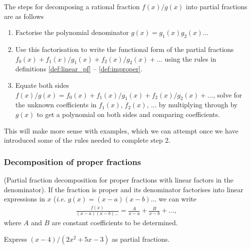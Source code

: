 The steps for decomposing a rational fraction $f(x)/g(x)$ into partial fractions are as follows
\begin{enumerate}
    \item Factorise the polynomial denominator $g(x) = g_1(x)g_2(x)\ldots$
    \item Use this factorisation to write the functional form of the partial fractions $f_0(x) + f_1(x)/g_1(x) + f_2(x)/g_2(x) + \ldots$ using the rules in definitions \ref{def:linear_pf} -- \ref{def:improper}. 
    \item Equate both sides $f(x)/g(x) = f_0(x) + f_1(x)/g_1(x) + f_2(x)/g_2(x) + \ldots$, solve for the unknown coefficients in $f_1(x)$, $f_2(x)$, $\ldots$ by multiplying through by $g(x)$ to get a polynomial on both sides and comparing coefficients.
\end{enumerate}
This will make more sense with examples, which we can attempt once we have introduced some of the rules needed to complete step 2.

\subsubsection{Decomposition of proper fractions}
\label{sec:proper_fracs}

\begin{definition}
\label{def:linear_pf}
    (Partial fraction decomposition for proper fractions with linear factors in the denominator). If the fraction is proper and its denominator factorises into linear expressions in $x$ (\textit{i.e.} $g(x) = (x-a)(x-b)\ldots$ we can write
    \begin{align}
        \label{linear_pf} \frac{f(x)}{(x-a)(x-b)\ldots} = \frac{A}{x-a} + \frac{B}{x-b} + \ldots ,
    \end{align}
    where $A$ and $B$ are constant coefficients to be determined. 
\end{definition}

\begin{example}
    Express $(x-4)/(2x^2+5x-3)$ as partial fractions.
\end{example}
\\

